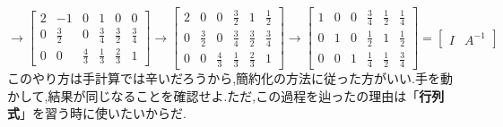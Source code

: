 \[
\rightarrow
\begin{bmatrix}
2 & -1 & 0 & 1 & 0 & 0 \\
0 & \frac{3}{2} & 0 & \frac{3}{4} & \frac{3}{2} & \frac{3}{4} \\
0 & 0 & \frac{4}{3} & \frac{1}{3} & \frac{2}{3} & 1
\end{bmatrix}
\rightarrow
\begin{bmatrix}
2 & 0 & 0 & \frac{3}{2} & 1 & \frac{1}{2} \\
0 & \frac{3}{2} & 0 & \frac{3}{4} & \frac{3}{2} & \frac{3}{4} \\
0 & 0 & \frac{4}{3} & \frac{1}{3} & \frac{2}{3} & 1
\end{bmatrix}
\rightarrow
\begin{bmatrix}
1 & 0 & 0 & \frac{3}{4} & \frac{1}{2} & \frac{1}{4} \\
0 & 1 & 0 & \frac{1}{2} & 1 & \frac{1}{2} \\
0 & 0 & 1 & \frac{1}{4} & \frac{1}{2} & \frac{3}{4}
\end{bmatrix}=
\begin{bmatrix}
    I & A^{-1}
\end{bmatrix}
\]
このやり方は手計算では辛いだろうから,簡約化の方法に従った方がいい.手を動かして,結果が同じなることを確認せよ.ただ,この過程を辿ったの理由は「\textbf{行列式}」を習う時に使いたいからだ.
